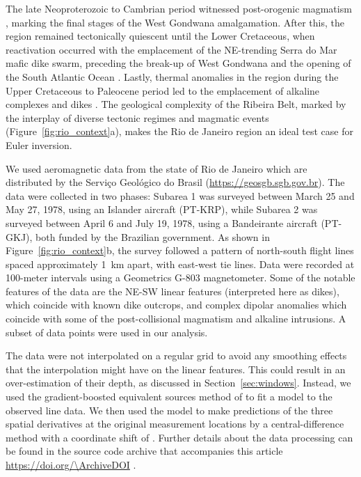 The late Neoproterozoic to Cambrian period witnessed post-orogenic magmatism
\citep[\textit{e.g.,}][]{Valeriano2011}, marking the final stages of the West
Gondwana amalgamation. After this, the region remained tectonically quiescent
until the Lower Cretaceous, when reactivation occurred with the emplacement of
the NE-trending Serra do Mar mafic dike swarm, preceding the break-up of West
Gondwana and the opening of the South Atlantic Ocean \citep{Almeida2013}.
Lastly, thermal anomalies in the region during the Upper Cretaceous to
Paleocene period led to the emplacement of alkaline complexes and dikes
\citep{Thompson1998}.
The geological complexity of the Ribeira Belt, marked by the interplay of diverse tectonic
regimes and magmatic events (Figure~\ref{fig:rio_context}a), makes the Rio de Janeiro
region an ideal test case for Euler inversion. 

We used aeromagnetic data from the state of Rio de Janeiro which are distributed by the Serviço Geológico do Brasil (\url{https://geosgb.sgb.gov.br}).
The data were collected in two phases: Subarea 1 was surveyed between March 25 and May 27, 1978, using
an Islander aircraft (PT-KRP), while Subarea 2 was surveyed between April 6 and
July 19, 1978, using a Bandeirante aircraft (PT-GKJ), both funded by the
Brazilian government. 
As shown in Figure~\ref{fig:rio_context}b, the survey followed a pattern of north-south flight lines spaced approximately \qty{1}{\km} apart, with east-west tie lines.
Data were recorded at 100-meter intervals using a Geometrics G-803 magnetometer.
Some of the notable features of the data are the NE-SW linear features (interpreted here as dikes), which coincide with known dike outcrops, and complex dipolar anomalies which coincide with some of the post-collisional magmatism and alkaline intrusions.
A subset of \RioNData{} data points were used in our analysis.

The data were not interpolated on a regular grid to avoid any smoothing effects that the interpolation might have on the linear features.
This could result in an over-estimation of their depth, as discussed in Section~\ref{sec:windows}.
Instead, we used the gradient-boosted equivalent sources method of \citet{Soler2021} to fit a model to the observed line data.
We then used the model to make predictions of the three spatial derivatives at the original measurement locations by a central-difference method with a coordinate shift of \RioDerivSpacing{}.
Further details about the data processing can be found in the source code archive that accompanies this article \url{https://doi.org/\ArchiveDOI} \citep{figshare}.

